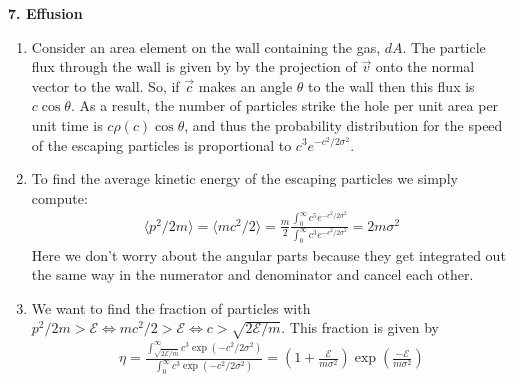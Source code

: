 \documentclass{article}
\theoremstyle{definition}
\newcommand{\f}[2]{\frac{#1}{#2}}
\newcommand{\lp}{\left(}
\newcommand{\rp}{\right)}
\begin{document}
\noindent \textbf{7. Effusion}
\begin{enumerate}[label=(\alph*)]
	\item Consider an area element on the wall containing the gas, $dA$. The particle flux through the wall is given by by the projection of $\vec{v}$ onto the normal vector to the wall. So, if $\vec{c}$ makes an angle $\theta$ to the wall then this flux is $c \cos\theta$. As a result, the number of particles strike the hole per unit area per unit time is $c\rho(c)\cos\theta$, and thus the probability  distribution for the speed of the escaping particles is proportional to $c^3 e^{-c^2/2\sigma^2}$. 
	 
	\item To find the average kinetic energy of the escaping particles we simply compute:
	\begin{align*}
	\langle p^2/2m \rangle = \langle  m c^2/2 \rangle  = \f{m}{2} \f{\int_0^\infty c^5 e^{-c^2/2\sigma^2}}{\int_0^\infty c^3 e^{-c^2/2\sigma^2}} = \boxed{2m\sigma^2}
 	\end{align*}
 	Here we don't worry about the angular parts because they get integrated out the same way in the numerator and denominator and cancel each other. 
 	
	\item We want to find the fraction of particles with $p^2/2m > \mathcal{E} \iff mc^2/2 > \mathcal{E} \iff c > \sqrt{2\mathcal{E}/m}$. This fraction is given by 
	\begin{align*}
	\eta = \f{\int_{\sqrt{2\mathcal{E}/m}}^\infty c^3 \exp(-c^2/2\sigma^2)}{\int_0^\infty c^3 \exp(-c^2/2\sigma^2)} = \boxed{\lp 1+ \f{\mathcal{E}}{m\sigma^2} \rp\exp\lp \f{-\mathcal{E}}{m\sigma^2} \rp}
	\end{align*}
\end{enumerate}
\end{document}
